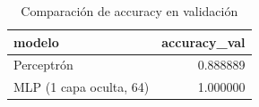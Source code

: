 \begin{table}
\caption{Comparación de accuracy en validación}
\label{tab:comparacion_modelos}
\begin{tabular}{lr}
\toprule
modelo & accuracy_val \\
\midrule
Perceptrón & 0.888889 \\
MLP (1 capa oculta, 64) & 1.000000 \\
\bottomrule
\end{tabular}
\end{table}
